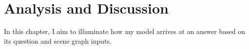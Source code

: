 \chapter{Analysis and Discussion}
\label{chapter:discussion}

In this chapter, I aim to illuminate how my model arrives at an answer based on its question and scene graph inputs.